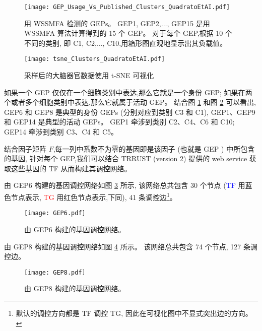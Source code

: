 \begin{figure}[!htbp]
    \centering
    \texttt{[image: GEP\_Usage\_Vs\_Published\_Clusters\_QuadratoEtAI.pdf]}
    \caption{
    用 WSSMFA 检测的 GEPs。
    GEP1, GEP2,$\ldots$, GEP15 是用 WSSMFA 算法计算得到的 15 个 GEP。
    对于每个 GEP,根据 10 个不同的类别,
    即 C1, C2,$\ldots$, C10,用箱形图直观地显示出其负载值。 
    }
    \label{fig:gep-gep}
\end{figure}

\begin{figure}[!htbp]
    \centering
    \texttt{[image: tsne\_Clusters\_QuadratoEtAI.pdf]}
    \caption{
    采样后的大脑器官数据使用 t-SNE 可视化
    }
    \label{fig:gep-tsne}
\end{figure}


如果一个 GEP 仅仅在一个细胞类别中表达,那么它就是一个身份 GEP;
如果在两个或者多个细胞类别中表达,那么它就属于活动 GEP。
结合图 \ref{fig:gep-gep} 和图 \ref{fig:gep-tsne} 可以看出, 
GEP6 和 GEP8 是典型的身份 GEPs (分别对应到类别 C3 和 C1), GEP1、GEP9 和 GEP14 是典型的活动 GEPs。
GEP1 牵涉到类别 C2、C4、C6 和 C10; GEP14 牵涉到类别 C3、C4 和 C5。


结合因子矩阵 $F$,每一列中系数不为零的基因即是该因子 (也就是 GEP ) 中所包含的基因,
针对每个 GEP,我们可以结合 TRRUST (version 2) 提供的 web service 获取这些基因的 TF 从而构建其调控网络。

由 GEP6 构建的基因调控网络如图 \ref{fig:gep-grn-gep6} 所示,
该网络总共包含 30 个节点 (\textcolor{blue}{TF} 用蓝色节点表示, \textcolor{red}{TG} 用红色节点表示,下同), 41 条调控边\footnote{默认的调控方向都是 TF 调控 TG, 因此在可视化图中不显式突出边的方向。
}。
\begin{figure}[!htbp]
    \centering
    \texttt{[image: GEP6.pdf]}
    \caption{由 GEP6 构建的基因调控网络。}
    \label{fig:gep-grn-gep6}
\end{figure}

由 GEP8 构建的基因调控网络如图 \ref{fig:gep-grn-gep8} 所示。
该网络总共包含 74 个节点, 127 条调控边。
\begin{figure}[!htbp]
    \centering
    \texttt{[image: GEP8.pdf]}
    \caption{由 GEP8 构建的基因调控网络。}
    \label{fig:gep-grn-gep8}
\end{figure}

